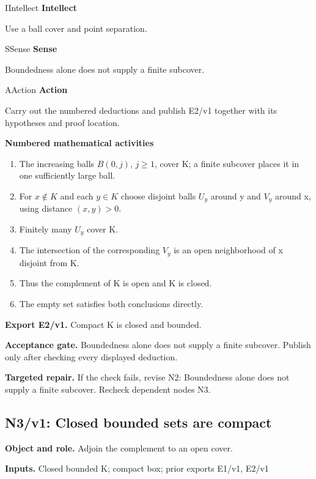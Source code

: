 \documentclass[preprint,12pt,aps,pra,showkeys,amsmath,amssymb,superscriptaddress,floatfix]{revtex4-2}
\theoremstyle{definition}
\theoremstyle{remark}
\newcommand{\mmfaculty}[3]{%
 \begin{mmfacultybox}{#1}{#2}
 {\sffamily\bfseries\color{MMBlue}#2}\par\smallskip #3
 \end{mmfacultybox}}
\newcommand{\field}[2]{\par\smallskip\noindent\textbf{#1.} #2\par}
\begin{document}
\mmfaculty{I}{Intellect}{Use a ball cover and point separation.}

\mmfaculty{S}{Sense}{Boundedness alone does not supply a finite subcover.}

\mmfaculty{A}{Action}{Carry out the numbered deductions and publish E2/v1 together with its
hypotheses and proof location.}

\smallskip\noindent\textbf{Numbered mathematical activities}

\begin{enumerate}[label=N2.\arabic*,leftmargin=3.4em]

\item The increasing balls \(B(0,j)\), \(j\ge 1\), cover K; a finite subcover
places it in one sufficiently large ball.

\item For \(x\notin K\) and each \(y\in K\) choose disjoint balls \(U_y\)
around y and \(V_y\) around x, using distance \((x,y)>0\).

\item Finitely many \(U_y\) cover K.

\item The intersection of the corresponding \(V_y\) is an open neighborhood of
x disjoint from K.

\item Thus the complement of K is open and K is closed.

\item The empty set satisfies both conclusions directly.

\end{enumerate}

\field{Export E2/v1}{Compact K is closed and bounded.}

\field{Acceptance gate}{Boundedness alone does not supply a finite subcover. Publish only after
checking every displayed deduction.}

\field{Targeted repair}{If the check fails, revise N2: Boundedness alone does not supply a
finite subcover. Recheck dependent nodes N3.}

\clearpage

\subsection{N3/v1: Closed bounded sets are compact}

\field{Object and role}{Adjoin the complement to an open cover.}

\field{Inputs}{Closed bounded K; compact box; prior exports E1/v1, E2/v1}
\end{document}
